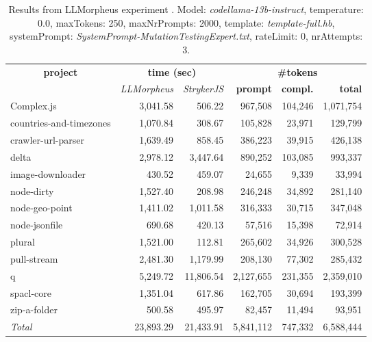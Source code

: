 
\begin{table*}[hbt!]
\centering
{\scriptsize
\begin{tabular}{l||r|r|r|r|r}
\multicolumn{1}{c|}{\bf project} & \multicolumn{2}{|c|}{\bf time (sec)} & \multicolumn{3}{|c|}{\bf \#tokens} \\
               & {\it LLMorpheus} & {\it StrykerJS} & {\bf prompt} & {\bf compl.} & {\bf total} \\
\hline
  Complex.js & 3,041.58 & 506.22 & 967,508 & 104,246 & 1,071,754 \\ 
countries-and-timezones & 1,070.84 & 308.67 & 105,828 & 23,971 & 129,799 \\ 
crawler-url-parser & 1,639.49 & 858.45 & 386,223 & 39,915 & 426,138 \\ 
delta & 2,978.12 & 3,447.64 & 890,252 & 103,085 & 993,337 \\ 
image-downloader & 430.52 & 459.07 & 24,655 & 9,339 & 33,994 \\ 
node-dirty & 1,527.40 & 208.98 & 246,248 & 34,892 & 281,140 \\ 
node-geo-point & 1,411.02 & 1,011.58 & 316,333 & 30,715 & 347,048 \\ 
node-jsonfile & 690.68 & 420.13 & 57,516 & 15,398 & 72,914 \\ 
plural & 1,521.00 & 112.81 & 265,602 & 34,926 & 300,528 \\ 
pull-stream & 2,481.30 & 1,179.99 & 208,130 & 77,302 & 285,432 \\ 
q & 5,249.72 & 11,806.54 & 2,127,655 & 231,355 & 2,359,010 \\ 
spacl-core & 1,351.04 & 617.86 & 162,705 & 30,694 & 193,399 \\ 
zip-a-folder & 500.58 & 495.97 & 82,457 & 11,494 & 93,951 \\ 
\hline
  \textit{Total} & 23,893.29 & 21,433.91 & 5,841,112 & 747,332 & 6,588,444 \\
  \end{tabular}
  }
  \\[2mm]
  \caption{Results from LLMorpheus experiment .
    Model: \textit{codellama-13b-instruct}, 
    temperature: 0.0, 
    maxTokens: 250, 
    maxNrPrompts: 2000, 
    template: \textit{template-full.hb}, 
    systemPrompt: \textit{SystemPrompt-MutationTestingExpert.txt}, 
    rateLimit: 0, 
    nrAttempts: 3.  
  }
  \label{table:Cost:run356:codellama-13b-instruct:template-full.hb:0.0}
\end{table*}